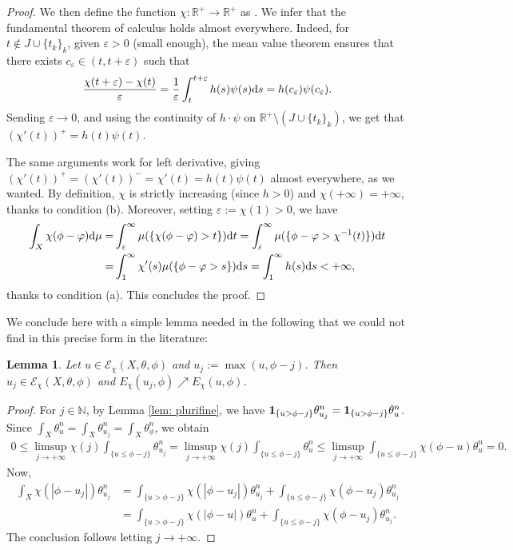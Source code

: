 \documentclass[11pt]{article}
\numberwithin{equation}{section}
\numberwithin{equation}{section}
\newtheorem{Lemma}[Theorem]{Lemma}
\theoremstyle{plain}
\newcommand{\R}{\mathbb R}
\newcommand{\N}{\mathbb N}
\newcommand{\id}{{\bf 1}}
\begin{document}
\begin{proof}
We then define the function $\chi\colon \R^+\rightarrow \R^+$ as . We infer that the fundamental theorem of calculus holds almost everywhere. Indeed, for $t\notin J\cup \{t_k\}_k$, given $\varepsilon>0$ (small enough), the mean value theorem ensures that there exists $c_\varepsilon \in (t, t+\varepsilon)$ such that
\[\frac{\chi (t+\varepsilon)-\chi (t)}{\varepsilon} = \frac{1}{\varepsilon} \int_t^{t+\varepsilon} h(s) \psi(s) {\rm d}s = h(c_\varepsilon) \psi(c_\varepsilon).\]
Sending $\varepsilon\to 0$, and using the continuity of $h\cdot \psi$ on $\R^+\setminus (J\cup \{t_k\}_k)$, we get that $(\chi'(t))^+=h(t)\psi(t)$.

The same arguments work for left derivative, giving $(\chi'(t))^+=(\chi'(t))^-=\chi'(t)=h(t)\psi(t)$ almost everywhere, as we wanted.
By definition, $\chi$ is strictly increasing (since $h> 0$) and $\chi(+\infty)=+\infty$, thanks to condition (b). Moreover, setting $\varepsilon:=\chi (1)>0$, we have
\begin{align*}
\int_X \chi (\phi-\varphi) {\rm d}\mu = & \int_{\varepsilon}^\infty \mu(\{ \chi (\phi-\varphi) >t\}) {\rm d}t=\int_{\varepsilon}^\infty \mu(\{ \phi-\varphi >\chi^{-1}(t)\}) {\rm d}t\\
=& \int_{1}^\infty \chi'(s) \mu(\{ \phi-\varphi >s\}) {\rm d}s= \int_{1}^\infty h(s) {\rm d}s <+\infty,
\end{align*}
thanks to condition (a). This concludes the proof.
\end{proof}

We conclude here with a simple lemma needed in the following that we could not find in this precise form in the literature:

\begin{Lemma}\label{energy increases}
 Let $u\in \mathcal{E}_{\chi}(X,\theta,\phi)$ and $u_j:=\max (u,\phi -j)$. Then $u_j \in \mathcal{E}_{\chi}(X,\theta,\phi)$ and $E_{\chi}(u_j,\phi) \nearrow E_{\chi}(u,\phi)$.
\end{Lemma}
\begin{proof}
 For $j\in \N$, by Lemma \ref{lem: plurifine}, we have $\id_{\{u>\phi -j\}} \theta_{u_j}^n= \id_{\{u>\phi-j\}} \theta_{u}^n$. Since $\int_X \theta_{u}^n=\int_X \theta_{u_j}^n=\int_X \theta_\phi^n$, we obtain
\begin{align*}
0\leq \limsup_{j\to +\infty} \chi(j)\int_{\{u\leq \phi-j\}}\!\theta_{u_j}^n = \limsup_{j\to +\infty} \chi(j)\int_{\{u\leq \phi-j\}}\!\theta_{u}^n
\leq \limsup_{j\to +\infty} \int_{\{u\leq\phi-j\}}\! \chi (\phi-u)\theta_{u}^n =0.
\end{align*}
Now,
\begin{align*}
\int_X \chi (|\phi-u_j|) \theta_{u_j}^n &= \int_{\{ u > \phi-j\}} \chi (|\phi-u_j|) \theta_{u_j}^n+ \int_{\{ u \leq \phi-j\}} \chi (\phi-u_j) \theta_{u_j}^n \\
 &= \int_{\{ u > \phi-j\}} \chi (|\phi-u|) \theta_{u}^n+ \int_{\{ u \leq \phi-j\}} \chi (\phi-u_j) \theta_{u_j}^n.
\end{align*}
The conclusion follows letting $j\rightarrow +\infty$.
\end{proof}
\end{document}

